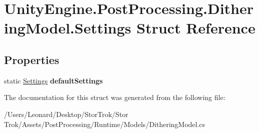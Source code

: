 \hypertarget{struct_unity_engine_1_1_post_processing_1_1_dithering_model_1_1_settings}{}\section{Unity\+Engine.\+Post\+Processing.\+Dithering\+Model.\+Settings Struct Reference}
\label{struct_unity_engine_1_1_post_processing_1_1_dithering_model_1_1_settings}
\subsection*{Properties}
\begin{DoxyCompactItemize}
\item 
\mbox{\label{struct_unity_engine_1_1_post_processing_1_1_dithering_model_1_1_settings_a3eb701066dfc32db93f8aa3bfa540b1a}} 
static \hyperlink{struct_unity_engine_1_1_post_processing_1_1_dithering_model_1_1_settings}{Settings} {\bfseries default\+Settings}
\end{DoxyCompactItemize}


The documentation for this struct was generated from the following file\+:\begin{DoxyCompactItemize}
\item 
/\+Users/\+Leonard/\+Desktop/\+Stor\+Trok/\+Stor Trok/\+Assets/\+Post\+Processing/\+Runtime/\+Models/Dithering\+Model.\+cs\end{DoxyCompactItemize}
